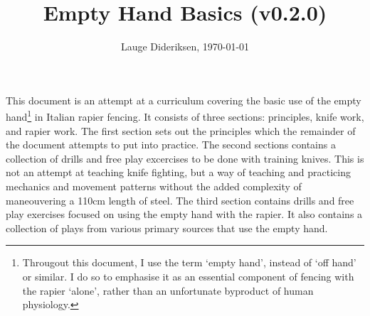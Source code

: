 \documentclass[article, 12pt, a4paper]{memoir}
\title{\Huge Empty Hand Basics (v0.2.0)} %
\author{\Large Lauge Dideriksen, \today} %
\date{}
\begin{document}
\OnehalfSpacing


{\raggedright\thetitle}\medbreak
{\raggedright\theauthor}\bigbreak


\captionnamefont{\footnotesize}\captiontitlefont{\footnotesize}
\begingroup\let\clearpage\relax\raggedbottom


\noindent This document is an attempt at a curriculum covering the basic use of the empty hand\footnote{Througout this document, I use the term `empty hand', instead of `off hand' or similar. I do so to emphasise it as an essential component of fencing with the rapier `alone', rather than an unfortunate byproduct of human physiology.} in Italian rapier fencing.
It consists of three sections: principles, knife work, and rapier work.
The first section sets out the principles which the remainder of the document attempts to put into practice.
The second sections contains a collection of drills and free play excercises to be done with training knives.
This is not an attempt at teaching knife fighting, but a way of teaching and practicing mechanics and movement patterns without the added complexity of maneouvering a 110cm length of steel.
The third section contains drills and free play exercises focused on using the empty hand with the rapier.
It also contains a collection of plays from various primary sources that use the empty hand.
\end{document}

